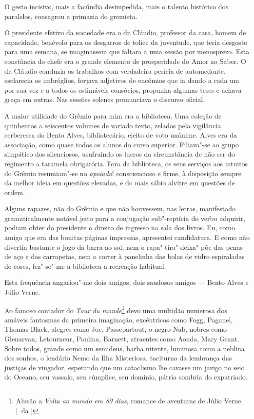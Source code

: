 
O gesto incisivo,
mais a facúndia desimpedida, mais o talento histórico dos paralelos,
consagrou a primazia do gremista. 

O presidente efetivo da sociedade era
o dr.\,Cláudio, professor da casa, homem de capacidade, benévolo para os
desgarros de tolice da juventude, que teria desgosto para uma semana,
se imaginassem que faltara a uma sessão por menosprezo. Esta constância
do chefe era o grande elemento de prosperidade do Amor ao Saber. 
O dr.\,Cláudio conduzia os trabalhos com verdadeira perícia de automedonte,
esclarecia os imbróglios, forjava adjetivos de encômios que ia dando a
cada um por sua vez e a todos os estimáveis consócios, propunha algumas
teses e achava graça em outras. Nas sessões solenes pronunciava o
discurso oficial. 

A maior utilidade do Grêmio para mim era a
biblioteca. Uma coleção de quinhentos a seiscentos volumes de variado
texto, zelados pela vigilância cerberesca do Bento Alves,
bibliotecário, eleito de voto unânime. Alves era da associação, como
quase todos os alunos do curso superior. Filiava"-se ao grupo
simpático dos silenciosos, usufruindo os lucros da circunstância de não
ser do regimento a taramela obrigatória. Fora da biblioteca, os seus
serviços aos intuitos do Grêmio resumiam"-se no \textit{apoiado}! consciencioso
e firme, à disposição sempre da melhor ideia em questões elevadas, e do
mais sábio alvitre em questões de ordem. 

Alguns rapazes, não do Grêmio
e que não houvessem, nas letras, manifestado gramaticalmente notável
jeito para a conjugação sub"-reptícia do verbo adquirir, podiam obter
do presidente o direito de ingresso na sala dos livros. Eu, como amigo
que era das bonitas páginas impressas, apresentei candidatura. E como
não divertia bastante o jogo da barra ao sol, nem o
rapa"-tira"-deixa"-põe das penas de aço e das carrapetas, nem o
correr à panelinha das bolas de vidro espiraladas de cores, fez"-se"-me
a biblioteca a recreação habitual. 

Esta frequência angariou"-me dois
amigos, dois saudosos amigos --- Bento Alves e Júlio Verne. 

Ao famoso contador do \textit{Tour du monde}\footnote{ Alusão a \textit{Volta ao mundo em 80 dias}, 
romance de aventuras de Júlio Verne. [~da ]} devo uma multidão numerosa dos amáveis
fantasmas da primeira imaginação, excêntricos como Fogg, Paganel,
Thomas Black, alegres como Joe, Passepartout, o negro Nab, nobres como
Glenarvan, Letourneur, Paulina, Barnett, atraentes como Aouda, Mary
Grant. Sobre todos, grande como um semideus, barba nitente, luminosa
como a neblina dos sonhos, o lendário Nemo da Ilha Misteriosa,
taciturno da lembrança das justiças de vingador, esperando que um
cataclismo lhe cavasse um jazigo no seio do Oceano, seu vassalo, seu
cúmplice, seu domínio, pátria sombria do expatriado.

